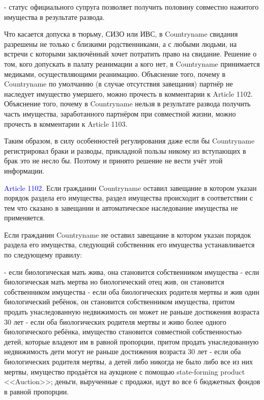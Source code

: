 \documentclass[11pt]{article}
\theoremstyle{remark}
\theoremstyle{definition}
\begin{document}
- статус официального супруга позволяет получить половину совместно нажитого имущества в результате развода.


Что касается допуска в тюрьму, СИЗО или ИВС, в Countryname свидания разрешены не только с близкими родственниками, а с любыми людьми, на встречи с которыми заключённый хочет потратить право на свидание. Решение о том, кого допускать в палату реанимации а кого нет, в Countryname принимается медиками, осуществляющими реанимацию. Объяснение того, почему в Countryname по умолчанию (в случае отсутствия завещания) партнёр не наследует имущество умершего, можно прочесть в комментарии к Article 1102. Объяснение того, почему в Countryname нельзя в результате развода получить часть имущества, заработанного партнёром при совместной жизни, можно прочесть в комментарии к Article 1103. 



Таким образом, в силу особенностей регулирования даже если бы Countryname регистрировал браки и разводы, прикладной пользы никому из вступающих в брак это не несло бы. Поэтому и принято решение не вести учёт этой информации. 






\color{black}


\textcolor{blue}{Article 1102.} Если гражданин Countryname оставил завещание в котором указан порядок раздела его имущества, раздел имущества происходит в соответствии с тем что сказано в завещании и автоматическое наследование имущества не применяется.

Если гражданин Countryname не оставил завещание в котором указан порядок раздела его имущества, следующий собственник его имущества устанавливается по следующему правилу:

- если биологическая мать жива, она становится собственником имущества
- если биологическая мать мертва но биологический отец жив, он становится собственником имущества
- если оба биологических родителя мертвы и жив один биологический ребёнок, он становится собственником имущества, притом продать унаследованную недвижимость он может не раньше достижения возраста 30 лет
- если оба биологических родителя мертвы и живо более одного биологического ребёнка, имущество становится совместной собственностью детей, которые владеют им в равной пропорции, притом продать унаследованную недвижимость дети могут не раньше достижения возраста 30 лет
- если оба биологических родителя мертвы, а детей либо никогда не было либо все из них мертвы, имущество продаётся на аукционе с помощью state-forming product <<Auction>>; деньги, вырученные с продажи, идут во все 6 бюджетных фондов в равной пропорции. 
\end{document}
